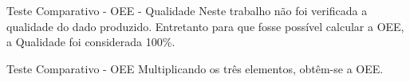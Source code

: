 \documentclass{beamer}
\begin{document}
    \begin{frame}{Teste Comparativo - OEE - Qualidade}
      Neste trabalho não foi verificada a qualidade do dado produzido. Entretanto para que fosse possível calcular a OEE, a Qualidade foi considerada 100\%.
    \end{frame}
    \begin{frame}{Teste Comparativo - OEE}
        Multiplicando os três elementos, obtêm-se a OEE.
        \begin{center}

        \end{center}
    \end{frame}
\end{document}
